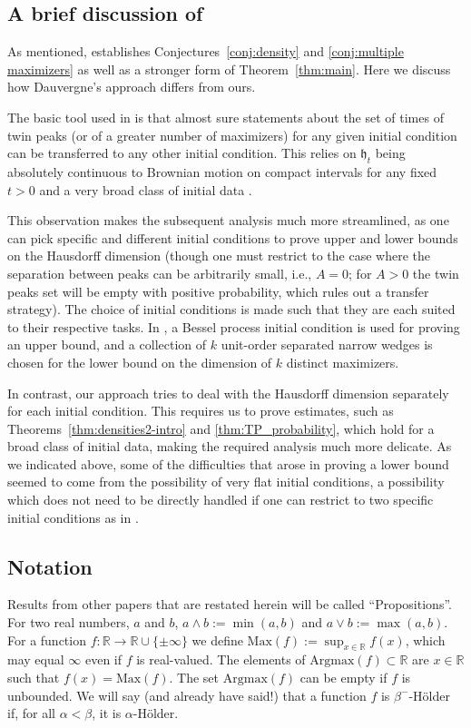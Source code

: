 \documentclass[oneside,final,11pt]{amsart}
\theoremstyle{definition}
\newcommand{\fh}{\mathfrak{h}}
\newcommand{\R}{\mathbb{R}}
\newcommand{\1}[1]{\mathbf{1}_{#1}}
\newcommand{\Max}{\mathrm{Max}}
\newcommand{\Argmax}{\mathrm{Arg max}}
\numberwithin{equation}{section}
\begin{document}
\subsection{A brief discussion of \cite{dauvergne2022non}}\label{sec:Dau22}
As mentioned, \cite{dauvergne2022non} establishes Conjectures~\ref{conj:density} and \ref{conj:multiple maximizers} as well as a stronger form of Theorem~\ref{thm:main}. Here we discuss how Dauvergne's approach differs from ours.

The basic tool used in \cite{dauvergne2022non} is that almost sure statements about the set of times of twin peaks (or of a greater number of maximizers) for any given initial condition can be transferred to any other initial condition. This relies on $\fh_t$ being absolutely continuous to Brownian motion on compact intervals for any fixed $t>0$ and a very broad class of initial data \cite{sarkar2020brownian}.

This observation makes the subsequent analysis much more streamlined, as one can pick specific and different initial conditions to prove upper and lower bounds on the Hausdorff dimension (though one must restrict to the case where the separation between peaks can be arbitrarily small, i.e., $A=0$; for $A>0$ the twin peaks set will be empty with positive probability, which rules out a transfer strategy). The choice of initial conditions is made such that they are each suited to their respective tasks. In \cite{dauvergne2022non}, a Bessel process initial condition is used for proving an upper bound, and a collection of $k$ unit-order separated narrow wedges is chosen for the lower bound on the dimension of $k$ distinct maximizers.

In contrast, our approach tries to deal with the Hausdorff dimension separately for each initial condition. This requires us to prove estimates, such as Theorems~\ref{thm:densities2-intro} and \ref{thm:TP_probability}, which hold for a broad class of initial data, making the required analysis much more delicate. As we indicated above, some of the difficulties that arose in proving a lower bound seemed to come from the possibility of very flat initial conditions, a possibility which does not need to be directly handled if one can restrict to two specific initial conditions as in \cite{dauvergne2022non}.


\subsection{Notation}
Results from other papers that are restated herein will be called ``Propositions''. For two real numbers, $a$ and $b$, $a\wedge b:= \min(a,b)$ and $a\vee b:=\max(a,b)$. For a function $f : \R \to \R \cup \{\pm \infty\}$ we define $\Max(f) := \sup_{x \in \R} f(x)$, which may equal  $\infty$ even if $f$ is real-valued.  The elements of $\Argmax(f) \subset \R$ are $x \in \R$ such that $f(x) = \Max(f)$. The set $\Argmax(f)$ can be empty if $f$ is unbounded. %
 We will say (and already have said!) that a function $f$ is $\beta^{{\scriptscriptstyle-}}$-H\"older if, for all $\alpha<\beta$, it is $\alpha$-H\"older.
\end{document}

